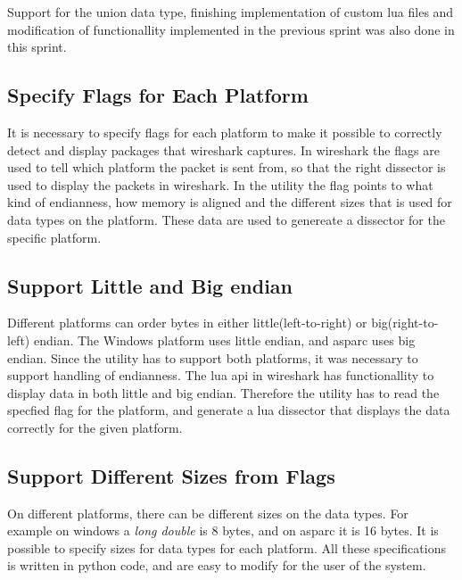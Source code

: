 Support for the \gls{union} data type, finishing implementation of custom \Gls{lua} files 
and modification of functionallity implemented in the previous sprint was also 
done in this sprint.

\subsection{Specify Flags for Each Platform}
It is necessary to specify flags for each platform to make it possible to 
correctly detect and display packages that wireshark captures. In wireshark 
the flags are used to tell which platform the \gls{packet} is sent from, so that 
the right \gls{dissector} is used to display the \glspl{packet} in \Gls{wireshark}. In the 
\gls{utility} the flag points to what kind of \gls{endianness}, how memory is aligned and 
the different sizes that is used for data types on the platform. These data 
are used to genereate a \gls{dissector} for the specific platform.

\subsection{Support Little and Big \Gls{endian}}
Different platforms can order bytes in either little(left-to-right) or 
big(right-to-left) \gls{endian}. The \Gls{Windows} platform uses little \gls{endian}, and \gls{asparc} 
uses big \gls{endian}. Since the \gls{utility} has to support both platforms, it was 
necessary to support handling of \gls{endianness}. The \Gls{lua} \gls{api} in \Gls{wireshark} has 
functionallity to display data in both little and big \gls{endian}. Therefore the 
\gls{utility} has to read the specfied flag for the platform, and generate a \Gls{lua} 
\gls{dissector} that displays the data correctly for the given platform.

\subsection{Support Different Sizes from Flags}
On different platforms, there can be different sizes on the data types. For 
example on windows a \emph{long double} is 8 bytes, and on \gls{asparc} it is 16 
bytes. It is possible to specify sizes for data types for each platform. All 
these specifications is written in \Gls{python} code, and are easy to modify for the 
user of the system.

